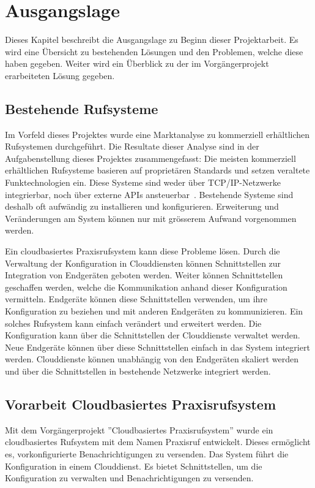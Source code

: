 \section{Ausgangslage}

Dieses Kapitel beschreibt die Ausgangslage zu Beginn dieser Projektarbeit.
Es wird eine Übersicht zu bestehenden Lösungen und den Problemen, welche diese haben gegeben.
Weiter wird ein Überblick zu der im Vorgängerprojekt erarbeiteten Lösung gegeben.

\subsection{Bestehende Rufsysteme}

Im Vorfeld dieses Projektes wurde eine Marktanalyse zu kommerziell erhältlichen Rufsystemen durchgeführt.
Die Resultate dieser Analyse sind in der Aufgabenstellung dieses Projektes zusammengefasst:
Die meisten kommerziell erhältlichen Rufsysteme basieren auf proprietären Standards und setzen veraltete Funktechnologien ein.
Diese Systeme sind weder über TCP/IP-Netzwerke integrierbar, noch über externe APIs ansteuerbar~\cite{aufgabenstellung}.
Bestehende Systeme sind deshalb oft aufwändig zu installieren und konfigurieren.
Erweiterung und Veränderungen am System können nur mit grösserem Aufwand vorgenommen werden.

Ein cloudbasiertes Praxisrufsystem kann diese Probleme lösen.
Durch die Verwaltung der Konfiguration in Clouddiensten können Schnittstellen zur Integration von Endgeräten geboten werden.
Weiter können Schnittstellen geschaffen werden, welche die Kommunikation anhand dieser Konfiguration vermitteln.
Endgeräte können diese Schnittstellen verwenden, um ihre Konfiguration zu beziehen und mit anderen Endgeräten zu kommunizieren.
Ein solches Rufsystem kann einfach verändert und erweitert werden.
Die Konfiguration kann über die Schnittstellen der Clouddienste verwaltet werden.
Neue Endgeräte können über diese Schnittstellen einfach in das System integriert werden.
Clouddienste können unabhängig von den Endgeräten skaliert werden und über die Schnittstellen in bestehende Netzwerke integriert werden.

\subsection{Vorarbeit Cloudbasiertes Praxisrufsystem}

Mit dem Vorgängerprojekt ''Cloudbasiertes Praxisrufsystem'' wurde ein cloudbasiertes Rufsystem mit dem Namen Praxisruf entwickelt.
Dieses ermöglicht es, vorkonfigurierte Benachrichtigungen zu versenden.
Das System führt die Konfiguration in einem Clouddienst.
Es bietet Schnittstellen, um die Konfiguration zu verwalten und Benachrichtigungen zu versenden.

